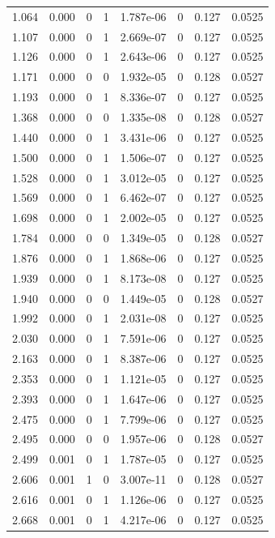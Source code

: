 \documentclass[preview]{standalone}
\begin{document}
{{\begin{tabular}{L{1.2cm}C{1.2cm} C{0.3cm}C{0.5cm} C{1.4cm}C{1.4cm} C{1.4cm}C{1.4cm}}
  1.064  &  0.000  & 0     &  1 &  1.787e-06  & 0  & 0.127 &  0.0525   \\ 
  1.107  &  0.000  & 0     &  1 &  2.669e-07  & 0  & 0.127 &  0.0525   \\ 
  1.126  &  0.000  & 0     &  1 &  2.643e-06  & 0  & 0.127 &  0.0525   \\ 
  1.171  &  0.000  & 0     &  0 &  1.932e-05  & 0  & 0.128 &  0.0527   \\ 
  1.193  &  0.000  & 0     &  1 &  8.336e-07  & 0  & 0.127 &  0.0525   \\ 
  1.368  &  0.000  & 0     &  0 &  1.335e-08  & 0  & 0.128 &  0.0527   \\ 
  1.440  &  0.000  & 0     &  1 &  3.431e-06  & 0  & 0.127 &  0.0525   \\ 
  1.500  &  0.000  & 0     &  1 &  1.506e-07  & 0  & 0.127 &  0.0525   \\ 
  1.528  &  0.000  & 0     &  1 &  3.012e-05  & 0  & 0.127 &  0.0525   \\ 
  1.569  &  0.000  & 0     &  1 &  6.462e-07  & 0  & 0.127 &  0.0525   \\ 
  1.698  &  0.000  & 0     &  1 &  2.002e-05  & 0  & 0.127 &  0.0525   \\ 
  1.784  &  0.000  & 0     &  0 &  1.349e-05  & 0  & 0.128 &  0.0527   \\ 
  1.876  &  0.000  & 0     &  1 &  1.868e-06  & 0  & 0.127 &  0.0525   \\ 
  1.939  &  0.000  & 0     &  1 &  8.173e-08  & 0  & 0.127 &  0.0525   \\ 
  1.940  &  0.000  & 0     &  0 &  1.449e-05  & 0  & 0.128 &  0.0527   \\ 
  1.992  &  0.000  & 0     &  1 &  2.031e-08  & 0  & 0.127 &  0.0525   \\ 
  2.030  &  0.000  & 0     &  1 &  7.591e-06  & 0  & 0.127 &  0.0525   \\ 
  2.163  &  0.000  & 0     &  1 &  8.387e-06  & 0  & 0.127 &  0.0525   \\ 
  2.353  &  0.000  & 0     &  1 &  1.121e-05  & 0  & 0.127 &  0.0525   \\ 
  2.393  &  0.000  & 0     &  1 &  1.647e-06  & 0  & 0.127 &  0.0525   \\ 
  2.475  &  0.000  & 0     &  1 &  7.799e-06  & 0  & 0.127 &  0.0525   \\ 
  2.495  &  0.000  & 0     &  0 &  1.957e-06  & 0  & 0.128 &  0.0527   \\ 
  2.499  &  0.001  & 0     &  1 &  1.787e-05  & 0  & 0.127 &  0.0525   \\ 
  2.606  &  0.001  & 1     &  0 &  3.007e-11  & 0  & 0.128 &  0.0527   \\ 
  2.616  &  0.001  & 0     &  1 &  1.126e-06  & 0  & 0.127 &  0.0525   \\ 
  2.668  &  0.001  & 0     &  1 &  4.217e-06  & 0  & 0.127 &  0.0525   \\ 
\hline 
\end{tabular} 

}}
\end{document}
